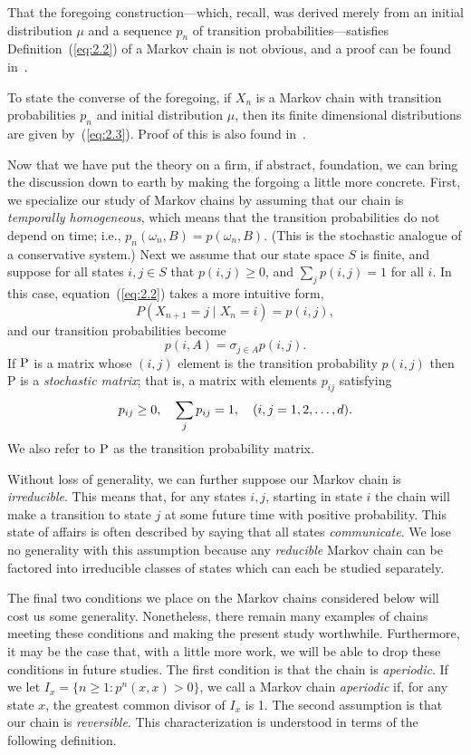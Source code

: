 That the foregoing construction---which, recall, was derived merely from an
initial distribution $\mu$ and a sequence $p_n$ of transition
probabilities---satisfies Definition~(\ref{eq:2.2}) of a Markov chain is not
obvious, and a proof can be found in~\cite{Durret:1996}.

To state the converse of the foregoing, if $X_n$ is a Markov chain with
transition probabilities $p_n$ and initial distribution $\mu$, then its finite
dimensional distributions are given by~(\ref{eq:2.3}). Proof of this is also found
in~\cite{Durret:1996}. 

Now that we have put the theory on a firm, if abstract, foundation, we can bring
the discussion down to earth by making the forgoing a little more
concrete. First, we specialize our study of Markov chains by assuming that our
chain is \emph{temporally homogeneous}, which means that the transition
probabilities do not depend on time; i.e., 
$p_n(\omega_n, B) = p(\omega_n, B)$. (This is the stochastic analogue of a
conservative system.) 
Next we assume that our state space $S$ is finite, and suppose for all states
$i,j \in S$ that $p(i, j) \geq 0$, and $\sum_j p(i, j) = 1$ for all $i$. In
this case, equation~(\ref{eq:2.2}) takes a more intuitive form,
\[
P(X_{n+1}=j \mid X_n = i) =p(i,j),
\]
and our transition probabilities become
\[
p(i,A) = \sigma_{j\in A} p(i,j).
\]
If $\P$ is a matrix whose $(i, j)$ element is the transition probability 
$p(i, j)$ then P is a \emph{stochastic matrix}; that is, a matrix with elements
$p_{ij}$ satisfying 
\[
\pij \geq 0, \quad \sum_j \pij =1, \quad (i, j =1, 2, \dots, d).
\]
We also refer to $\P$ as the transition probability matrix.

Without loss of generality, we can further suppose our Markov chain is \emph{irreducible}. This
means that, for any states $i, j$, starting in state $i$ the chain will make a
transition to state $j$ at some future time with positive probability. This
state of affairs is often described by saying that all states \emph{communicate}. We
lose no generality with this assumption because any \emph{reducible} Markov chain can
be factored into irreducible classes of states which can each be studied
separately. 

The final two conditions we place on the Markov chains considered below will cost us
some generality. Nonetheless, there remain many examples of chains meeting these conditions
and making the present study worthwhile. Furthermore, it may be the case that, with a little
more work, we will be able to drop these conditions in future studies. The first condition is that
the chain is \emph{aperiodic}. If we let $I_x = \{n \geq 1: p^n(x,x) > 0\}$, we
call a Markov chain \emph{aperiodic} if, for any state $x$, the greatest common
divisor of $I_x$ is 1. The second assumption is that our chain is 
\emph{reversible}. This characterization is understood in terms of the following definition.

